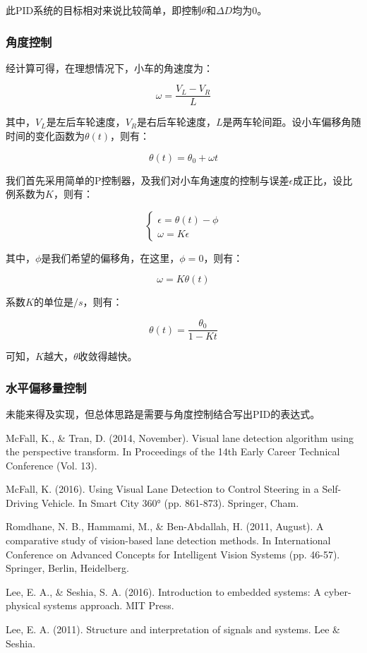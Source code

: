 \documentclass[11pt]{article}
\begin{document}
此PID系统的目标相对来说比较简单，即控制$\theta$和$\Delta D$均为0。

\subsubsection{角度控制}

经计算可得，在理想情况下，小车的角速度为：

$$
\omega = \frac{V_L - V_R}{L}
$$

其中，$V_L$是左后车轮速度，$V_R$是右后车轮速度，$L$是两车轮间距。设小车偏移角随时间的变化函数为$\theta(t)$，则有：

$$
\theta(t) = \theta_0 + \omega t
$$

我们首先采用简单的P控制器，及我们对小车角速度的控制与误差$\epsilon$成正比，设比例系数为$K$，则有：

$$
\begin{cases}
\epsilon = \theta(t) - \phi \\
\omega = K\epsilon
\end{cases}
$$

其中，$\phi$是我们希望的偏移角，在这里，$\phi = 0$，则有：

$$
\omega = K \theta(t)
$$

系数$K$的单位是$/s$，则有：

$$
\theta(t) = \frac{\theta_0}{1 - Kt}
$$

可知，$K$越大，$\theta$收敛得越快。

\subsubsection{水平偏移量控制}

未能来得及实现，但总体思路是需要与角度控制结合写出PID的表达式。


\begin{thebibliography}{99}

 McFall, K., \& Tran, D. (2014, November). Visual lane detection algorithm using the perspective transform. In Proceedings of the 14th Early Career Technical Conference (Vol. 13).

 McFall, K. (2016). Using Visual Lane Detection to Control Steering in a Self-Driving Vehicle. In Smart City 360° (pp. 861-873). Springer, Cham.

 Romdhane, N. B., Hammami, M., \& Ben-Abdallah, H. (2011, August). A comparative study of vision-based lane detection methods. In International Conference on Advanced Concepts for Intelligent Vision Systems (pp. 46-57). Springer, Berlin, Heidelberg.

 Lee, E. A., \& Seshia, S. A. (2016). Introduction to embedded systems: A cyber-physical systems approach. MIT Press.

 Lee, E. A. (2011). Structure and interpretation of signals and systems. Lee \& Seshia. 

\end{thebibliography}
\end{document}
